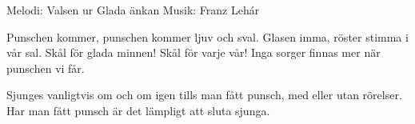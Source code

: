 \begin{song}

\begin{songmeta}
Melodi: Valsen ur Glada änkan
Musik: Franz Lehár
\end{songmeta}

\begin{songtext}
Punschen kommer, punschen kommer
ljuv och sval.
Glasen imma, röster stimma
i vår sal.
Skål för glada minnen!
Skål för varje vår!
Inga sorger finnas mer när punschen vi får.
\end{songtext}

\begin{songnotes}
Sjunges vanligtvis om och om igen tills man fått punsch, med eller utan rörelser. Har man fått punsch är det lämpligt att sluta sjunga.
\end{songnotes}

\end{song}
